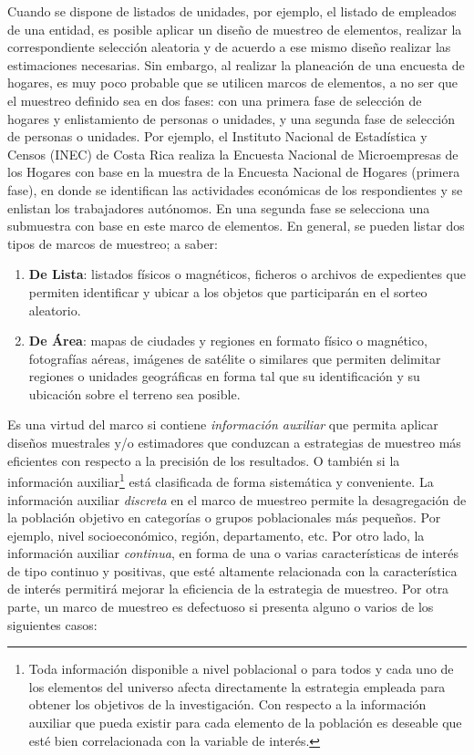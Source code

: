 \documentclass[
  12pt,
  spanish,
]{book}
\providecommand{\tightlist}{%
  \setlength{\itemsep}{0pt}\setlength{\parskip}{0pt}}
\begin{document}
Cuando se dispone de listados de unidades, por ejemplo, el listado de empleados de una entidad, es posible aplicar un diseño de muestreo de elementos, realizar la correspondiente selección aleatoria y de acuerdo a ese mismo diseño realizar las estimaciones necesarias. Sin embargo, al realizar la planeación de una encuesta de hogares, es muy poco probable que se utilicen marcos de elementos, a no ser que el muestreo definido sea en dos fases: con una primera fase de selección de hogares y enlistamiento de personas o unidades, y una segunda fase de selección de personas o unidades. Por ejemplo, el Instituto Nacional de Estadística y Censos (INEC) de Costa Rica realiza la Encuesta Nacional de Microempresas de los Hogares con base en la muestra de la Encuesta Nacional de Hogares (primera fase), en donde se identifican las actividades económicas de los respondientes y se enlistan los trabajadores autónomos. En una segunda fase se selecciona una submuestra con base en este marco de elementos. En general, se pueden listar dos tipos de marcos de muestreo; a saber:

\begin{enumerate}
\def\labelenumi{\arabic{enumi}.}
\tightlist
\item
  \textbf{De Lista}: listados físicos o magnéticos, ficheros o archivos de expedientes que permiten identificar y ubicar a los objetos que participarán en el sorteo aleatorio.
\item
  \textbf{De Área}: mapas de ciudades y regiones en formato físico o magnético, fotografías aéreas, imágenes de satélite o similares que permiten delimitar regiones o unidades geográficas en forma tal que su identificación y su ubicación sobre el terreno sea posible.
\end{enumerate}

Es una virtud del marco si contiene \emph{información auxiliar} que permita aplicar diseños muestrales y/o estimadores que conduzcan a estrategias de muestreo más eficientes con respecto a la precisión de los resultados. O también si la información auxiliar\footnote{Toda información disponible a nivel poblacional o para todos y cada uno de los elementos del universo afecta directamente la estrategia empleada para obtener los objetivos de la investigación. Con respecto a la información auxiliar que pueda existir para cada elemento de la población es deseable que esté bien correlacionada con la variable de interés.} está clasificada de forma sistemática y conveniente. La información auxiliar \emph{discreta} en el marco de muestreo permite la desagregación de la población objetivo en categorías o grupos poblacionales más pequeños. Por ejemplo, nivel socioeconómico, región, departamento, etc. Por otro lado, la información auxiliar \emph{continua}, en forma de una o varias características de interés de tipo continuo y positivas, que esté altamente relacionada con la característica de interés permitirá mejorar la eficiencia de la estrategia de muestreo. Por otra parte, un marco de muestreo es defectuoso si presenta alguno o varios de los siguientes casos:
\end{document}
